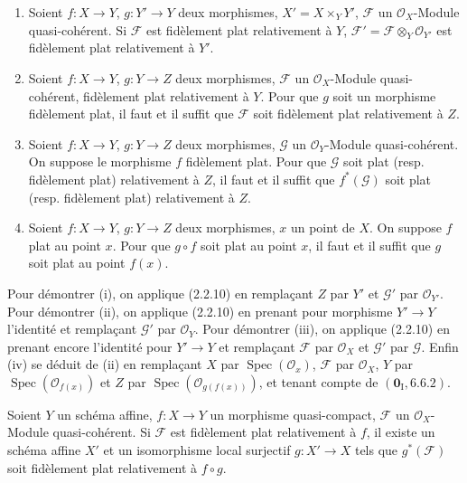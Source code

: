 \begin{corollary}[2.2.11]
\label{IV.2.2.11-fr}
\begin{enumerate}
\item[\textup{(i)}] Soient $f:X\to Y$, $g:Y'\to Y$ deux morphismes,
$X'=X\times_Y Y'$, $\mathscr F$ un $\mathcal O_X$-Module quasi-cohérent. Si
$\mathscr F$ est fidèlement plat relativement à $Y$,
$\mathscr F'=\mathscr F\otimes_Y\mathcal O_{Y'}$ est fidèlement plat
relativement à $Y'$.
\item[\textup{(ii)}] Soient $f:X\to Y$, $g:Y\to Z$ deux morphismes, $\mathscr F$ un
$\mathcal O_X$-Module quasi-cohérent, fidèlement plat relativement à $Y$.
Pour que $g$ soit un morphisme fidèlement plat, il faut et il suffit que
$\mathscr F$ soit fidèlement plat relativement à $Z$.
\item[\textup{(iii)}] Soient $f:X\to Y$, $g:Y\to Z$ deux morphismes, $\mathscr G$ un
$\mathcal O_Y$-Module quasi-cohérent. On suppose le morphisme $f$ fidèlement
plat. Pour que $\mathscr G$ soit plat \textup{(resp.} fidèlement plat) relativement à
$Z$, il faut et il suffit que $f^*(\mathscr G)$ soit plat \textup{(resp.} fidèlement
plat) relativement à $Z$.
\item[\textup{(iv)}] Soient $f:X\to Y$, $g:Y\to Z$ deux morphismes, $x$ un point de
$X$. On suppose $f$ plat au point $x$. Pour que $g\circ f$ soit plat au point
$x$, il faut et il suffit que $g$ soit plat au point $f(x)$.
\end{enumerate}
\end{corollary}

Pour démontrer (i), on applique (2.2.10) en remplaçant $Z$ par $Y'$ et
$\mathscr G'$ par $\mathcal O_{Y'}$. Pour démontrer (ii), on applique
(2.2.10) en prenant pour morphisme $Y'\to Y$ l'identité et remplaçant
$\mathscr G'$ par $\mathcal O_Y$. Pour démontrer (iii), on applique (2.2.10)
en prenant encore l'identité pour $Y'\to Y$ et remplaçant $\mathscr F$ par
$\mathcal O_X$ et $\mathscr G'$ par $\mathscr G$. Enfin (iv) se déduit de
(ii) en remplaçant $X$ par $\operatorname{Spec}(\mathcal O_x)$,
$\mathscr F$ par $\mathcal O_X$, $Y$ par
$\operatorname{Spec}(\mathcal O_{f(x)})$ et $Z$ par
$\operatorname{Spec}(\mathcal O_{g(f(x))})$, et tenant compte de
$(\mathbf{0}_{\mathrm I},6.6.2)$.

\begin{corollary}[2.2.12]
\label{IV.2.2.12-fr}
Soient $Y$ un schéma affine, $f:X\to Y$ un morphisme quasi-compact,
$\mathscr F$ un $\mathcal O_X$-Module quasi-cohérent. Si $\mathscr F$ est
fidèlement plat relativement à $f$, il existe un schéma affine $X'$ et un
isomorphisme local surjectif $g:X'\to X$ tels que $g^*(\mathscr F)$ soit
fidèlement plat relativement à $f\circ g$.
\end{corollary}

